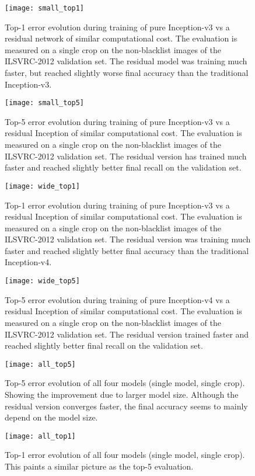 \documentclass[10pt,twocolumn,letterpaper]{article}
\begin{document}
\begin{figure}
\centering
\texttt{[image: small\_top1]}
\caption{Top-1 error evolution during training of pure Inception-v3 vs a
  residual network of similar computational cost. The evaluation is measured on
  a single crop on the non-blacklist images of the ILSVRC-2012 validation set.
  The residual model was training much faster, but reached
  slightly worse final accuracy than the traditional Inception-v3.
}
\label{fig:smalltop1}
\end{figure}\begin{figure}
\centering
\texttt{[image: small\_top5]}
\caption{Top-5 error evolution during training of pure Inception-v3 vs a
  residual Inception of similar computational cost. The evaluation is measured on
  a single crop on the non-blacklist images of the ILSVRC-2012 validation set.
  The residual version has trained much faster and reached slightly better final recall
  on the validation set.
}
\label{fig:smalltop5}
\end{figure}\begin{figure}
\centering
\texttt{[image: wide\_top1]}
\caption{Top-1 error evolution during training of pure Inception-v3 vs a
  residual Inception of similar computational cost. The evaluation is measured on
  a single crop on the non-blacklist images of the ILSVRC-2012 validation set.
  The residual version was training much faster and reached
  slightly better final accuracy than the traditional Inception-v4.
}
\label{fig:widetop1}
\end{figure}\begin{figure}
\centering
\texttt{[image: wide\_top5]}
\caption{Top-5 error evolution during training of pure Inception-v4 vs a
  residual Inception of similar computational cost. The evaluation is measured on
  a single crop on the non-blacklist images of the ILSVRC-2012 validation set.
  The residual version trained faster and reached slightly better final recall
  on the validation set.
}
\label{fig:widetop5}
\end{figure}\begin{figure}
\centering
\texttt{[image: all\_top5]}
\caption{Top-5 error evolution of all four models (single model, single crop).
  Showing the improvement due to larger model size. Although the residual
  version converges faster, the final accuracy seems to mainly depend on the
  model size.
}
\label{fig:alltop5}
\end{figure}\begin{figure}
\centering
\texttt{[image: all\_top1]}
\caption{Top-1 error evolution of all four models (single model, single crop).
  This paints a similar picture as the top-5 evaluation.
}
\label{fig:alltop1}
\end{figure}
\end{document}
